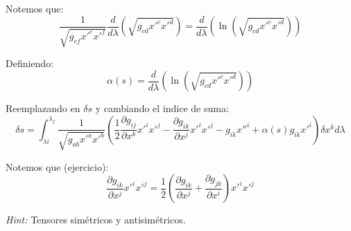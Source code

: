 \documentclass[paper=a4, fontsize=11pt,twoside]{scrartcl}
\begin{document}
Notemos que:
	\begin{equation*}
		\frac{1}{\sqrt{g_{ef}x'^{e}x'^{f}}} \frac{d}{d\lambda} \left( \sqrt{g_{cd}x'^{c}x'^{d}} \right)
		=  \frac{d}{d\lambda} \left( \ln \left( \sqrt{g_{cd}x'^{c}x'^{d}} \right) \right)
	\end{equation*}

Definiendo:
	\begin{equation*}
		\alpha(s) = \frac{d}{d\lambda} \left( \ln \left( \sqrt{g_{cd}x'^{c}x'^{d}} \right) \right)
	\end{equation*}
	
Reemplazando en $\delta s$ y cambiando el indice de suma:
	\begin{equation*}
		\delta s =  \int^{\lambda_{f}}_{\lambda{i}} \frac{1}{\sqrt{g_{ab}x'^{a}x'^{b}}} \left( \frac{1}{2}\frac{\partial g_{ij}}{\partial x^{k}} x'^{i}x'^{j} 
			                                       - \frac{\partial g_{ik}}{\partial x^{j}} x'^{i} x'^{j} - g_{ik}x''^{i} 
				                                        + \alpha\left( s \right) g_{ik}x'^{i} 
														\right) \delta x^{k}  d\lambda	
	\end{equation*}
	
\newpage
	
Notemos que (ejercicio):
	\begin{equation*}
		\frac{\partial g_{ik}}{\partial x^{j}} x'^{i} x'^{j} = \frac{1}{2} \left( \frac{\partial g_{ik}}{\partial x^{j}} + \frac{\partial g_{jk}}{\partial x^{i}} \right) x'^{i}x'^{j}
	\end{equation*}

\textit{Hint:} Tensores sim\'etricos y antisim\'etricos.\\
\end{document}
